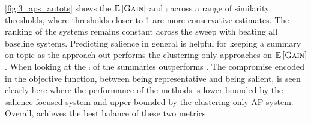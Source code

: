 \autoref{fig:3_aps_autots} shows the $\mathbb{E}\left[\textsc{Gain}\right]$ and $\comp$
across a range
of  similarity  thresholds,  where  thresholds  closer
to 1 are more conservative estimates. The ranking
of the systems remains constant across the sweep
with \sap{}
beating all baseline systems.
Predicting salience in general is helpful for keeping a summary on topic as 
the  \ranksal{}  approach out
performs  the  clustering  only  approaches  on  $\mathbb{E}\left[\textsc{Gain}\right]$.
When looking at the $\comp$ of the
summaries \ap{} outperforms \sap.  
The compromise  encoded  in  the  \sap{}
objective function, between being representative and
being salient, is seen clearly here where the performance of the \sap{}
methods is lower
bounded by the salience focused  \ranksal{}  system and
upper bounded by the clustering only AP system.
Overall, \sap{}
achieves the best balance
of these two metrics.


